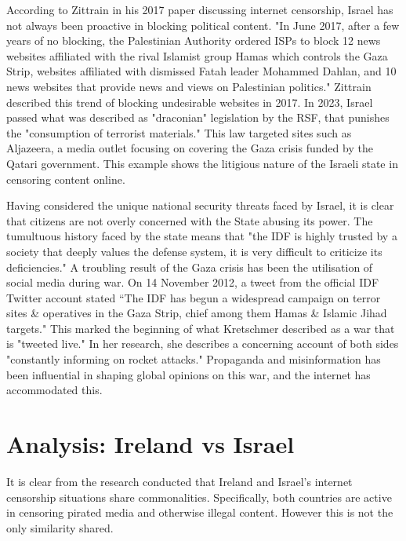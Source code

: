 According to Zittrain in his 2017 paper discussing internet censorship, Israel has not always been proactive in blocking political content. "In June 2017, after a few years of no blocking, the Palestinian Authority ordered ISPs to block 12 news websites affiliated with the rival Islamist group Hamas which controls the Gaza Strip, websites affiliated with dismissed Fatah leader Mohammed Dahlan, and 10 news websites that provide news and views on Palestinian politics." \cite{zittrain2017shifting} Zittrain described this trend of blocking undesirable websites in 2017. In 2023, Israel passed what was described as "draconian" legislation by the RSF, that punishes the "consumption of terrorist materials." \cite{RSF2024IsraelCensorship} This law targeted sites such as Aljazeera, a media outlet focusing on covering the Gaza crisis funded by the Qatari government. \cite{AlJazeera2023Knesset} This example shows the litigious nature of the Israeli state in censoring content online. 

Having considered the unique national security threats faced by Israel, it is clear that citizens are not overly concerned with the State abusing its power. The tumultuous history faced by the state means that "the IDF is highly trusted by a society that deeply values the defense system, it is very difficult to criticize its deficiencies." \cite{MAGEN2018287} A troubling result of the Gaza crisis has been the utilisation of social media during war. On 14 November 2012, a tweet from the official IDF Twitter account stated “The IDF has begun a widespread campaign on terror sites \& operatives in the
Gaza Strip, chief among them Hamas \& Islamic Jihad targets." \cite{IDF_Twitter} This marked the beginning of what Kretschmer described as a war that is "tweeted live." In her research, she describes a concerning account of both sides "constantly informing on rocket attacks." \cite {Kretschmer_2017} Propaganda and misinformation has been influential in shaping global opinions on this war, and the internet has accommodated this.

\section{Analysis: Ireland vs Israel}
It is clear from the research conducted that Ireland and Israel's internet censorship situations share commonalities. Specifically, both countries are active in censoring pirated media and otherwise illegal content. However this is not the only similarity shared. 

